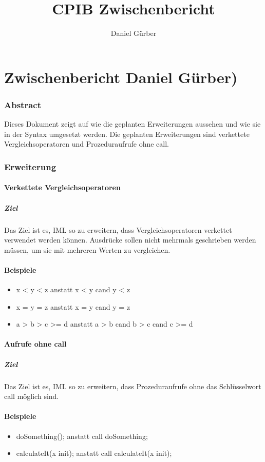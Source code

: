 \documentclass[a4paper,10pt]{article}
\title{CPIB Zwischenbericht}
\author{Daniel G\"urber}
\begin{document}
\part*{Zwischenbericht Daniel G\"urber)}
\section{Abstract}
Dieses Dokument zeigt auf wie die geplanten Erweiterungen aussehen und
wie sie in der Syntax umgesetzt werden. Die geplanten Erweiterungen
sind verkettete Vergleichsoperatoren und Prozeduraufrufe ohne call.
\section{Erweiterung}
\subsection{Verkettete Vergleichsoperatoren}
\subsubsection{Ziel}
Das Ziel ist es, IML so zu erweitern, dass Vergleichsoperatoren verkettet verwendet werden k\"onnen. Ausdr\"ucke sollen nicht mehrmals
geschrieben werden m\"ussen, um sie mit mehreren Werten zu vergleichen.
\subsection{Beispiele}
\begin{itemize}
\item x < y < z anstatt x < y cand y < z
\item x = y = z anstatt x = y cand y = z
\item a > b > c >= d anstatt a > b cand b > c cand c >= d
\end{itemize}
\subsection{Aufrufe ohne call}
\subsubsection{Ziel}
Das Ziel ist es, IML so zu erweitern, dass Prozeduraufrufe ohne das
Schlüsselwort call m\"oglich sind.
\subsection{Beispiele}
\begin{itemize}
\item doSomething(); anstatt call doSomething;
\item calculateIt(x init); anstatt call calculateIt(x init);
\end{itemize}
\end{document}
